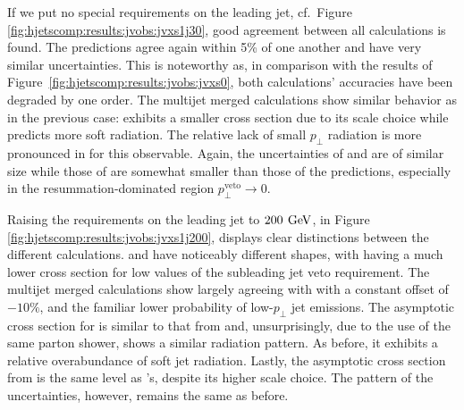 If we put no special requirements on the leading jet, cf.\ Figure 
\ref{fig:hjetscomp:results:jvobs:jvxs1j30}, good agreement 
between all calculations is found. The \hjetscompNNLOPS predictions agree again within 
5\% of one another and have very similar uncertainties. This is noteworthy 
as, in comparison with the results of 
Figure~\ref{fig:hjetscomp:results:jvobs:jvxs0}, both calculations' 
accuracies have been degraded by one order. The multijet merged calculations 
show similar behavior as in the previous case: \hjetscompMGaMC exhibits a smaller cross section due to 
its scale choice while \hjetscompSherpa \hjetscompMEPSatNLO predicts more soft radiation. 
The relative lack of small $p_\perp$ radiation is more 
pronounced in \hjetscompHerwig for this observable. Again, the uncertainties of \hjetscompMGaMC and \hjetscompSherpa 
are of similar size while those of \hjetscompHerwig are somewhat smaller than those of the \hjetscompNNLOPS 
predictions, especially in the resummation-dominated region 
$p_\perp^\text{veto}\to 0$.

Raising the requirements on the leading jet to $200\,\text{\:GeV}$, in Figure 
\ref{fig:hjetscomp:results:jvobs:jvxs1j200}, displays clear distinctions 
between the different calculations.  
\hjetscompSherpa \hjetscompNNLOPS and \hjetscompPowheg \hjetscompNNLOPS have noticeably different shapes, with \hjetscompSherpa having a 
much lower cross section for low values of the subleading jet veto requirement. 
The multijet merged calculations show \hjetscompHerwig largely agreeing with 
\hjetscompPowheg with a constant offset of $-10\%$, and the familiar lower 
probability of low-$p_\perp$ jet emissions. 
The asymptotic cross section for \hjetscompSherpa \hjetscompMEPSatNLO is similar to that from \hjetscompSherpa \hjetscompNNLOPS and, 
unsurprisingly, due to the use of the same parton shower, shows a 
similar radiation pattern. As before, it exhibits 
a relative overabundance of soft jet radiation. Lastly, the asymptotic cross section from \hjetscompMGaMC 
is the same level as \hjetscompPowheg's, despite 
its higher scale choice. The pattern of the uncertainties, however, 
remains the same as before.

